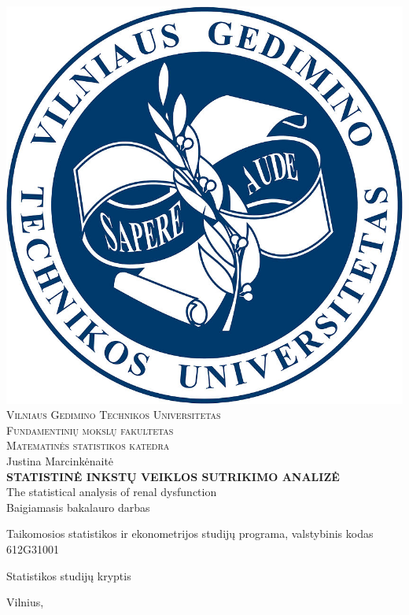 \documentclass[a4paper, 12pt]{article}
\begin{document}

\begin{titlepage}
\setcounter{page}{-2}
\centering
%
\includegraphics[scale = 0.6]{vgtu_herbas}\\[0.5\baselineskip]
%
{\Large\scshape Vilniaus Gedimino Technikos Universitetas}\\[0.2\baselineskip]
{\large\scshape Fundamentinių mokslų fakultetas}\\[0.2\baselineskip]
{\large\scshape Matematinės statistikos katedra}\\[0.2\baselineskip]
%
\vspace{\fill}
%
{\Large Justina Marcinkėnaitė}\\[3.0\baselineskip]

\MakeUppercase{\Large\bfseries Statistinė inkstų veiklos sutrikimo analizė}\\[0.3\baselineskip]
{\Large The statistical analysis of renal dysfunction}\\[1.0\baselineskip]

{\Large Baigiamasis bakalauro darbas}

\vspace{\fill}

Taikomosios statistikos ir ekonometrijos studijų programa, valstybinis kodas 612G31001

Statistikos studijų kryptis


\vspace{\fill}
%
Vilnius, \the\year
\end{titlepage}
\end{document}
